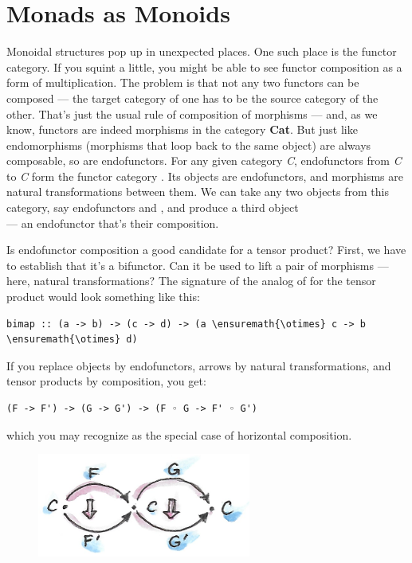 \section{Monads as Monoids}\label{monads-as-monoids}

Monoidal structures pop up in unexpected places. One such place is the
functor category. If you squint a little, you might be able to see
functor composition as a form of multiplication. The problem is that not
any two functors can be composed --- the target category of one has to
be the source category of the other. That's just the usual rule of
composition of morphisms --- and, as we know, functors are indeed
morphisms in the category \textbf{Cat}. But just like endomorphisms
(morphisms that loop back to the same object) are always composable, so
are endofunctors. For any given category \emph{C}, endofunctors from
\emph{C} to \emph{C} form the functor category \code{{[}C, C{]}}. Its
objects are endofunctors, and morphisms are natural transformations
between them. We can take any two objects from this category, say
endofunctors  and , and produce a third object\\
 --- an endofunctor that's their composition.

Is endofunctor composition a good candidate for a tensor product? First,
we have to establish that it's a bifunctor. Can it be used to lift a
pair of morphisms --- here, natural transformations? The signature of
the analog of  for the tensor product would look something
like this:

\begin{Verbatim}[commandchars=\\\{\}]
bimap :: (a -> b) -> (c -> d) -> (a \ensuremath{\otimes} c -> b \ensuremath{\otimes} d)
\end{Verbatim}
If you replace objects by endofunctors, arrows by natural
transformations, and tensor products by composition, you get:

\begin{Verbatim}[commandchars=\\\{\}]
(F -> F') -> (G -> G') -> (F ◦ G -> F' ◦ G')
\end{Verbatim}
which you may recognize as the special case of horizontal composition.

\begin{figure}[H]
\centering
\includegraphics[width=70mm]{images/horizcomp.png}
\end{figure}

